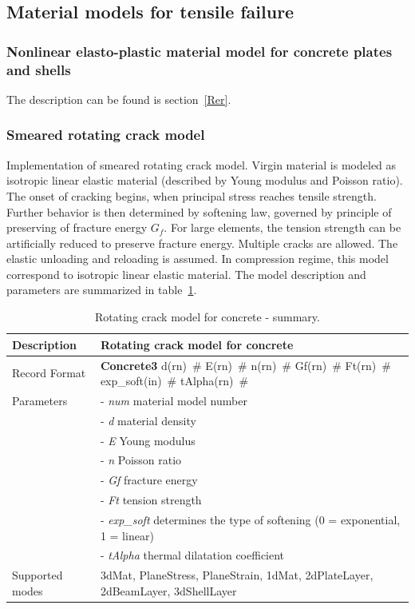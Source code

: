 \documentclass[a4paper]{article}
\newcommand{\descitem}[1]{{\noindent \bf #1}}
\newcommand{\elemparam}[2]{{{#1\tiny (#2)}~\#}}
\newcommand{\param}[1]{{\it #1}}
\begin{document}
\subsection{Material models for tensile failure}
\subsubsection{Nonlinear elasto-plastic material model for concrete
plates and shells}
The description can be found is section~\ref{Rer}.



\subsubsection{Smeared rotating crack model}
\label{rcm}
Implementation of smeared rotating crack model.
Virgin material is modeled as isotropic linear elastic material
(described by Young modulus and Poisson
ratio). The onset of cracking begins, when principal stress reaches
tensile strength.
Further behavior is then determined by softening law,
governed by principle of preserving of fracture
energy $G_f$. For large elements, the tension strength can be
artificially reduced
to preserve fracture energy. Multiple cracks are allowed.
The elastic unloading and reloading is assumed.
In compression regime, this model correspond to isotropic linear elastic material.
The model description and parameters are summarized
in table~\ref{rcm_table}.

\begin{table}[!htb]
\begin{tabular}{|l|p{9cm}|}
\hline
Description & Rotating crack model for concrete\\
\hline
Record Format & \descitem{Concrete3} \elemparam{d}{rn} \elemparam{E}{rn}
\elemparam{n}{rn} \elemparam{Gf}{rn} \elemparam{Ft}{rn} \elemparam{exp\_soft}{in} \elemparam{tAlpha}{rn} \\
Parameters &- \param{num} material model number\\
&- \param{d} material density\\
&- \param{E} Young modulus\\
&- \param{n} Poisson ratio\\
&- \param{Gf} fracture energy\\
&- \param{Ft} tension strength\\
&- \param{exp\_soft} determines the type of softening (0 =
exponential, 1 = linear)\\
&- \param{tAlpha} thermal dilatation coefficient\\
Supported modes& 3dMat, PlaneStress, PlaneStrain, 1dMat,
2dPlateLayer, 2dBeamLayer, 3dShellLayer\\
\hline
\end{tabular}
\caption{Rotating crack model for concrete - summary.}
\label{rcm_table}
\end{table}
\end{document}
